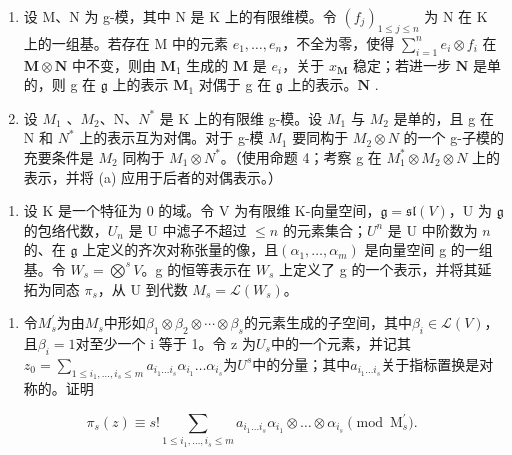 \begin{enumerate}
\def\labelenumi{(\alph{enumi})}
\item
  设 M、N 为 g-模，其中 N 是 K 上的有限维模。令 \((f_{j})_{1 \leqslant j \leqslant n}\) 为 N 在 K 上的一组基。若存在 M 中的元素 \(e_{1}, \ldots, e_{n}\)，不全为零，使得 \(\sum_{i=1}^{n} e_i \otimes f_i\) 在 \(\mathbf{M} \otimes \mathbf{N}\)  中不变，则由 \(\mathbf{M}_1\) 生成的 \(\mathbf{M}\) 是 \(e_i\)，关于 \(x_{\mathbf{M}}\) 稳定；若进一步 \(\mathbf{N}\) 是单的，则 g 在 \(\mathfrak{g}\) 上的表示 \(\mathbf{M}_1\) 对偶于 g 在 \(\mathfrak{g}\) 上的表示。\(\mathbf{N}\) .
\item
  设 \(M_{1}\) 、\(M_{2}\)、N、\(N^{*}\) 是 K 上的有限维 g-模。设 \(M_{1}\) 与 \(M_{2}\) 是单的，且 g 在 N 和 \(N^{*}\) 上的表示互为对偶。对于 g-模 \(M_{1}\) 要同构于 \(M_{2} \otimes N\)  的一个 g-子模的充要条件是 \(M_{2}\) 同构于 \(M_{1} \otimes N^{*}\)。（使用命题 4；考察 g 在 \(M_{1}^{*} \otimes M_{2} \otimes N\) 上的表示，并将 (a) 应用于后者的对偶表示。）
\end{enumerate}

\begin{enumerate}
\def\labelenumi{\arabic{enumi}.}
\setcounter{enumi}{4}
\tightlist
\item
  设 K 是一个特征为 0 的域。令 V 为有限维 K-向量空间，\(\mathfrak{g} = \mathfrak{sl}(V)\)，U 为 \(\mathfrak{g}\) 的包络代数，\(U_n\) 是 U 中滤子不超过 \(\leqslant n\) 的元素集合；\(U^n\) 是 U 中阶数为 \(n\) 的、在 \(\mathfrak{g}\) 上定义的齐次对称张量的像，且\((\alpha_1, \ldots, \alpha_m)\) 是向量空间 g 的一组基。令 \(W_{s} = \bigotimes^{s} V\)。g 的恒等表示在 \(W_{s}\) 上定义了 g 的一个表示，并将其延拓为同态 \(\pi_s\)，从 U 到代数 \(M_s = \mathcal{L}(W_s)\)。
\end{enumerate}

\begin{enumerate}
\def\labelenumi{(\alph{enumi})}
\tightlist
\item
  令\(M_{s}^{\prime}\)为由\(M_{s}\)中形如\(\beta_{1} \otimes \beta_{2} \otimes \cdots \otimes \beta_{s}\)的元素生成的子空间，其中\(\beta_{i} \in \mathcal{L}(V)\)，且\(\beta_{i} = 1\)对至少一个 i 等于 1。令 z 为\(U_{s}\)中的一个元素，并记其\(z_{0} = \sum_{1 \leqslant i_{1}, \ldots, i_{s} \leqslant m} a_{i_{1} \ldots i_{s}} \alpha_{i_{1}} \ldots \alpha_{i_{s}}\)为\(U^{s}\)中的分量；其中\(a_{i_{1} \ldots i_{s}}\)关于指标置换是对称的。证明
\end{enumerate}

\[
\pi_ {s} (z) \equiv s! \sum_ {1 \leqslant i _ {1}, \dots , i _ {s} \leqslant m} a _ {i _ {1} \dots i _ {s}} \alpha_ {i _ {1}} \otimes \dots \otimes \alpha_ {i _ {s}} \pmod {\mathrm{M} _ {s} ^ {\prime}}.
\]

